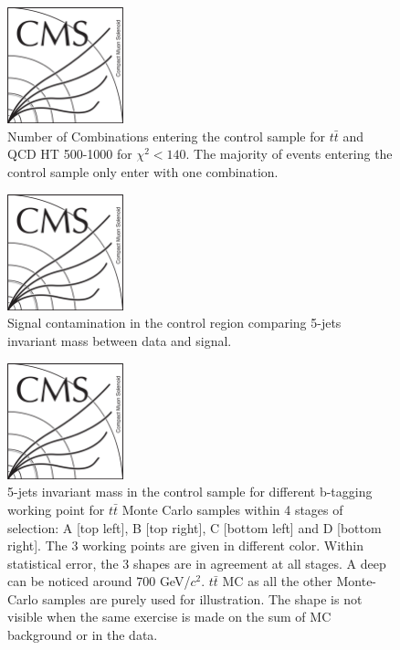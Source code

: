 \begin{figure}[!Hhtbp]
  \begin{center}
    \includegraphics[width=0.3\textwidth]{figs/CMSlogo.png}
    \caption{Number of Combinations entering the control sample for $t\bar{t}$ and QCD HT 500-1000 for $\chi^{2}<140$. The majority of events entering the control sample only enter with one combination.}
    \label{fig:NComb}
  \end{center}
\end{figure}\clearpage

\begin{figure}[!Hhtbp]
  \begin{center}
    \includegraphics[width=0.3\textwidth]{figs/CMSlogo.png}
    \caption{Signal contamination in the control region comparing 5-jets invariant mass between data and signal.}
    \label{fig:SigContamination}
  \end{center}
\end{figure}\clearpage

\begin{figure}[!Hhtbp]
  \begin{center}
    \includegraphics[width=0.3\textwidth]{figs/CMSlogo.png}
    \caption{5-jets invariant mass in the control sample for different b-tagging working point for $t\bar{t}$ Monte Carlo samples within 4 stages of selection: A [top left], B [top right], C [bottom left] and D [bottom right]. The 3 working points are given in different color. Within statistical error, the 3 shapes are in agreement at all stages. A deep can be noticed around 700 GeV/$c^{2}$. $t\bar{t}$ MC as all the other Monte-Carlo samples are purely used for illustration. The shape is not visible when the same exercise is made on the sum of MC background or in the data.}
    \label{fig:StageWPttbar}
  \end{center}
\end{figure}\clearpage

